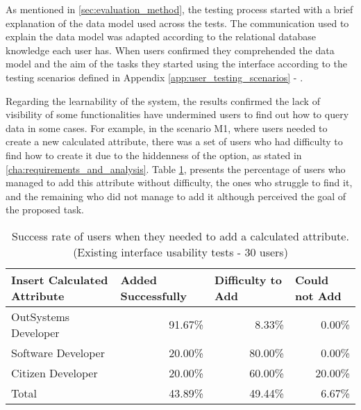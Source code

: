 As mentioned in \ref{sec:evaluation_method}, the testing process started with a brief explanation of the data model used across the tests. The communication used to explain the data model was adapted according to the relational database knowledge each user has. When users confirmed they comprehended the data model and the aim of the tasks they started using the interface according to the testing scenarios defined in Appendix \ref{app:user_testing_scenarios} - .

Regarding the learnability of the system, the results confirmed the lack of visibility of some functionalities have undermined users to find out how to query data in some cases. For example, in the scenario M1, where users needed to create a new calculated attribute, there was a set of users who had difficulty to find how to create it due to the hiddenness of the option, as stated in \ref{cha:requirements_and_analysis}. Table \ref{tab:existingInterfaceCalculatedAttribute}, presents the percentage of users who managed to add this attribute without difficulty, the ones who struggle to find it, and the remaining who did not manage to add it although perceived the goal of the proposed task.

\begin{table}[tb]
    \caption{Success rate of users when they needed to add a calculated attribute. (Existing interface usability tests - 30 users)}
    \label{tab:existingInterfaceCalculatedAttribute}
    \begin{tabular}{@{}lrrr@{}}
    \toprule
    \textbf{Insert Calculated Attribute} & \multicolumn{1}{l}{Added Successfully} & \multicolumn{1}{l}{Difficulty to Add} & \multicolumn{1}{l}{Could not Add} \\ \midrule
    OutSystems Developer                 & 91.67\%                                & 8.33\%                                & 0.00\%                          \\
    Software Developer                   & 20.00\%                                & 80.00\%                               & 0.00\%                          \\
    Citizen Developer                    & 20.00\%                                & 60.00\%                               & 20.00\%                         \\
    Total                                & 43.89\%                                & 49.44\%                               & 6.67\%                          \\ \bottomrule
    \end{tabular}
    \end{table}

